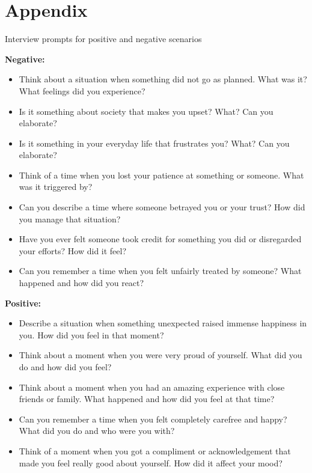 \newpage
\chapter*{Appendix}


\begin{table}[H]
    \caption{Interview prompts for positive and negative scenarios}
    \label{list:prompts}
    \begin{minipage}{0.9\textwidth}
      \textbf{Negative:}
      \begin{itemize}
        \item Think about a situation when something did not go as planned. What was it? What feelings did you experience? 
        \item Is it something about society that makes you upset? What? Can you elaborate? 
        \item Is it something in your everyday life that frustrates you? What? Can you elaborate?
        \item Think of a time when you lost your patience at something or someone. What was it triggered by?
        \item Can you describe a time where someone betrayed you or your trust? How did you manage that situation?
        \item Have you ever felt someone took credit for something you did or disregarded your efforts? How did it feel?
        \item Can you remember a time when you felt unfairly treated by someone? What happened and how did you react?
      \end{itemize}
  
      \textbf{Positive:}
      \begin{itemize}
        \item Describe a situation when something unexpected raised immense happiness in you. How did you feel in that moment? 
        \item Think about a moment when you were very proud of yourself. What did you do and how did you feel?
        \item Think about a moment when you had an amazing experience with close friends or family. What happened and how did you feel at that time?
        \item Can you remember a time when you felt completely carefree and happy? What did you do and who were you with?
        \item Think of a moment when you got a compliment or acknowledgement that made you feel really good about yourself. How did it affect your mood?
      \end{itemize}
    \end{minipage}
\end{table}

